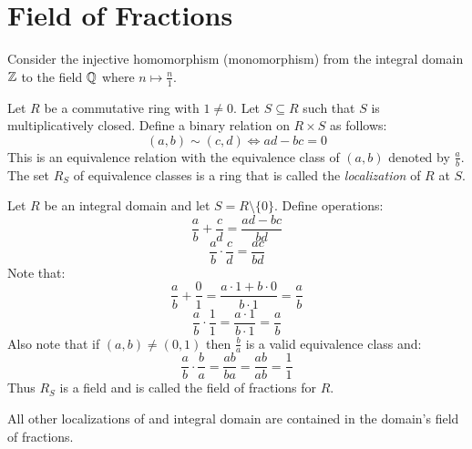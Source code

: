 \documentclass[letterpaper,12pt,fleqn]{article}
\begin{document}
\section*{Field of Fractions}

\begin{example}
  Consider the injective homomorphism (monomorphism) from the integral domain $\mathbb{Z}$ to
  the field $\mathbb{Q}$ where $n\mapsto\frac{n}{1}$.
\end{example}

\begin{definition}
  Let $R$ be a commutative ring with $1\ne0$. Let $S\subseteq R$ such that $S$ is
  multiplicatively closed. Define a binary relation on $R\times S$ as follows:
  \[(a,b)\sim(c,d)\iff ad-bc=0\]
  This is an equivalence relation with the equivalence class of $(a,b)$ denoted by
  $\frac{a}{b}$. The set $R_S$ of equivalence classes is a ring that is called the
  \emph{localization} of $R$ at $S$.
\end{definition}

\begin{definition}
  Let $R$ be an integral domain and let $S=R\setminus\{0\}$. Define operations:
  \[\frac{a}{b}+\frac{c}{d}=\frac{ad-bc}{bd}\]
  \[\frac{a}{b}\cdot\frac{c}{d}=\frac{ac}{bd}\]
  Note that:
  \[\frac{a}{b}+\frac{0}{1}=\frac{a\cdot1+b\cdot0}{b\cdot1}=\frac{a}{b}\]
  \[\frac{a}{b}\cdot\frac{1}{1}=\frac{a\cdot1}{b\cdot1}=\frac{a}{b}\]
  Also note that if $(a,b)\ne(0,1)$ then $\frac{b}{a}$ is a valid equivalence class and:
  \[\frac{a}{b}\cdot\frac{b}{a}=\frac{ab}{ba}=\frac{ab}{ab}=\frac{1}{1}\]
  Thus $R_S$ is a field and is called the field of fractions for $R$.
\end{definition}

All other localizations of and integral domain are contained in the domain's field of
fractions.
\end{document}
